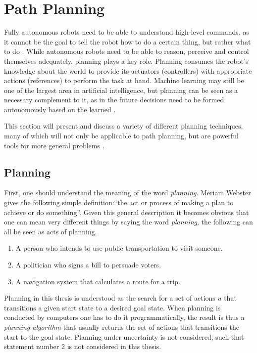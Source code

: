 \chapter{Path Planning}
\label{chap:pathPlanning}
Fully autonomous robots need to be able to understand high-level commands, as it cannot be the goal to tell the robot how to do a certain thing, but rather what to do \cite{Latombe.1991}. While autonomous robots need to be able to reason, perceive and control themselves adequately, planning plays a key role. Planning consumes the robot's knowledge about the world to provide its actuators (controllers) with appropriate actions (references) to perform the task at hand. Machine learning may still be one of the largest area in artificial intelligence, but planning can be seen as a necessary complement to it, as in the future decisions need to be formed autonomously based on the learned \cite{LaValle.2006}. 

This section will present and discuss a variety of different planning techniques, many of which will not only be applicable to path planning, but are powerful tools for more general problems \cite{LaValle.2006}.

\section{Planning}
First, one should understand the meaning of the word \emph{planning}. Meriam Webster gives the following simple definition:``the act or process of making a plan to achieve or do something''. Given this general description it becomes obvious that one can mean very different things by saying the word  \emph{planning}, the following can all be seen as acts of planning.
\begin{enumerate}
	\item A person who intends to use public transportation to visit someone.
	\item A politician who signs a bill to persuade voters.
	\item A navigation system that calculates a route for a trip.
\end{enumerate}

Planning in this thesis is understood as the search for a set of actions $u$ that transitions a given start state to a desired goal state. When planning is conducted by computers one has to do it programmatically, the result is thus a \emph{planning algorithm} that usually returns the set of actions that transitions the start to the goal state. Planning under uncertainty is not considered, such that statement number 2 is not considered in this thesis.

